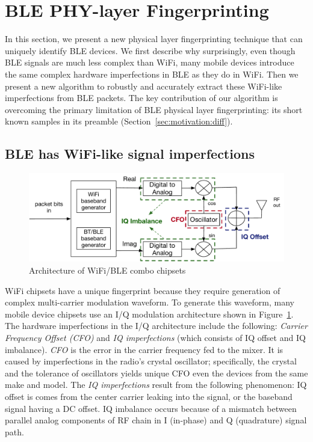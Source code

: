 \section{BLE PHY-layer Fingerprinting}
\label{sec:methodology}

In this section, we present a new physical layer fingerprinting technique that
can uniquely identify BLE devices.
%
We first describe why surprisingly, even though BLE signals are much less
complex than WiFi, many mobile devices introduce the  same complex hardware
imperfections in BLE as they do in WiFi.
%
Then we present a new algorithm to robustly and accurately extract these
WiFi-like imperfections from BLE packets.
%
The key contribution of our algorithm is overcoming the primary limitation of
BLE physical layer fingerprinting: its short known samples in its preamble
(Section~\ref{sec:motivation:diff}).

\subsection{BLE has WiFi-like signal imperfections} %

\begin{figure}[t!]
    \centering
    \includegraphics[width = \linewidth]{plots/IQchain.pdf} 
    \caption{Architecture of WiFi/BLE combo chipsets}
    \label{fig:iq_arch}
\end{figure}


WiFi chipsets have a unique fingerprint because they require generation of
complex multi-carrier modulation waveform. To generate this waveform, many
mobile device chipsets use an I/Q modulation architecture shown in
Figure~\ref{fig:iq_arch}.
%
The hardware imperfections in the I/Q architecture include the following:
\emph{Carrier Frequency Offset (CFO)} and \emph{IQ imperfections} (which
consists of IQ offset and IQ imbalance). \emph{CFO} is the error in the carrier
frequency fed to the mixer. It is caused by imperfections in the radio's
crystal oscillator; specifically, the crystal and the tolerance of oscillators
yields unique CFO even the devices from the same make and model.
%
The \emph{IQ imperfections} result from the following phenomenon: IQ offset is
comes from the center carrier leaking into the signal, or the baseband signal having a
DC offset.%
IQ imbalance occurs because of a mismatch
between parallel analog components of RF chain in I (in-phase) and Q
(quadrature) signal path.%


